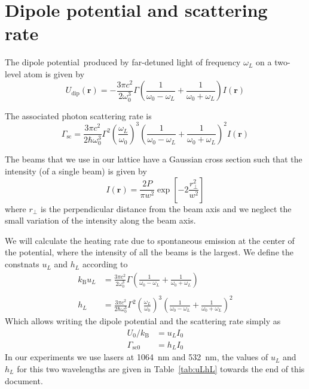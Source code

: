 \documentclass[11pt,letter]{article}
\newcommand{\bv}[1]{\ensuremath{\bm{#1}}}
\newcommand{\isat}{\ensuremath{I_{\mathrm{sat}}}}
\begin{document}
\section{Dipole potential and scattering rate}

The dipole potential\,\cite{Grimm2000b} produced by far-detuned light of
frequency $\omega_{L}$ on a two-level atom is given by
\begin{equation}
  U_{\text{dip}}(\bv{r}) = - 
  \frac{3\pi c^{2}}{ 2 \omega_{0}^{3} } \Gamma
  \left( \frac{1}{\omega_{0} - \omega_{L}} + \frac{1}{\omega_{0} 
   + \omega_{L}}  \right) I(\bv{r}) 
\end{equation}

The associated photon scattering rate is 
\begin{equation}
  \Gamma_{\text{sc}} = 
  \frac{3\pi c^{2}}{ 2 \hbar \omega_{0}^{3} } \Gamma^{2} 
  \left( \frac{ \omega_{L} }{ \omega_{0} } \right)^{3} 
  \left( \frac{1}{\omega_{0} - \omega_{L}} + \frac{1}{\omega_{0} 
   + \omega_{L}}  \right)^{2} I(\bv{r})
\end{equation} 
  

The beams that we use in our lattice have a Gaussian cross section such
that the intensity (of a single beam) is given by
\begin{equation}
  I(\bv{r}) = \frac{2P}{\pi w^{2}}  
   \exp\left[ -2\frac{r_{\perp}^{2} }{w^{2}}  \right]
\end{equation}
where $r_{\perp}$ is the perpendicular distance from the beam axis and we
neglect the small variation of the intensity along the beam axis.

We will calculate the heating rate due to spontaneous emission at the center
of the potential, where the intensity of all the beams is the largest.   We define the constnats $u_{L}$ and $h_{L}$ according to 
\begin{equation}
\begin{split}
  k_{\text{B}}  u_{L} & =  
  \frac{3 \pi c^{2}}{ 2 \omega_{0}^{3} } \Gamma
  \left( \frac{1}{\omega_{0} - \omega_{L}} + \frac{1}{\omega_{0} 
   + \omega_{L}}  \right)  \\ 
 &  \\ 
 h_{L} & =
  \frac{3 \pi c^{2}}{  2 \hbar \omega_{0}^{3} } \Gamma^{2} 
  \left( \frac{ \omega_{L} }{ \omega_{0} } \right)^{3} 
  \left( \frac{1}{\omega_{0} - \omega_{L}} + \frac{1}{\omega_{0} 
   + \omega_{L}}  \right)^{2} 
\end{split}
\end{equation}
Which allows writing the dipole potential and the scattering rate simply as
\begin{equation}
\begin{split} 
 U_{0}/k_{\text{B}} &  = u_{L} I_{0} \\ 
 \Gamma_{\text{sc0}} &  = h_{L} I_{0}
\end{split}
\label{eq:uLhL}
\end{equation}
In our experiments we use lasers at 1064~nm and 532~nm, the values of $u_{L}$
and $h_{L}$ for this two wavelengths are given in Table~\ref{tab:uLhL} towards
the end of this document.
\end{document}
